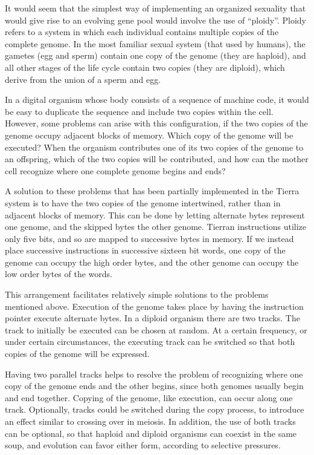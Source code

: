 It would seem that the simplest way of implementing an organized
sexuality that would give rise to an evolving gene pool would involve
the use of ``ploidy''.  Ploidy refers to a system in which each
individual contains multiple copies of the complete genome.  In the
most familiar sexual system (that used by humans), the gametes
(egg and sperm) contain one copy of the genome (they are haploid),
and all other stages of the life cycle contain two copies (they are
diploid), which derive from the union of a sperm and egg.

In a digital organism whose body consists of a sequence of machine
code, it would be easy to duplicate the sequence and include two
copies within the cell.  However, some problems can arise with this
configuration, if the two copies of the genome occupy adjacent
blocks of memory.  Which copy of the genome will be executed?  When
the organism contributes one of its two copies of the genome to
an offspring, which of the two copies will be contributed, and how
can the mother cell recognize where one complete genome begins and
ends?

A solution to these problems that has been partially implemented in
the Tierra system is to have the two copies of the genome intertwined,
rather than in adjacent blocks of memory.  This can be done by letting
alternate bytes represent one genome, and the skipped bytes the other
genome.  Tierran instructions utilize only five bits, and so are mapped
to successive bytes in memory.  If we instead place successive instructions
in successive sixteen bit words, one copy of the genome can occupy the
high order bytes, and the other genome can occupy the low order bytes
of the words.

This arrangement facilitates relatively simple solutions to the problems
mentioned above.  Execution of the genome takes place by having the
instruction pointer execute alternate bytes.  In a diploid organism
there are two tracks.  The track to initially be executed can be chosen
at random.  At a certain frequency, or under certain circumstances, the
executing track can be switched so that both copies of the genome will
be expressed.

Having two parallel tracks helps to resolve the problem of recognizing
where one copy of the genome ends and the other begins, since both genomes
usually begin and end together.  Copying of the genome, like execution,
can occur along one track.  Optionally, tracks could be switched during
the copy process, to introduce an effect similar to crossing over in
meiosis.  In addition, the use of both tracks can be optional, so that
haploid and diploid organisms can coexist in the same soup, and evolution
can favor either form, according to selective pressures.

